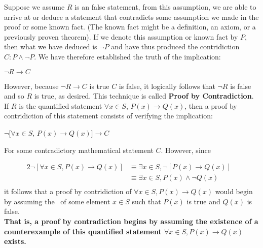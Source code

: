 Suppose we assume $R$ is an false statement, from this assumption, we are able to arrive at or deduce a statement that contradicts some assumption we made in the proof or some known fact. (The known fact might be a definition, an axiom, or a previously proven theorem). If we denote this assumption or known fact by $P$, then what we have deduced is $\neg P$ and have thus produced the contridiction $C:P \wedge \neg P$. We  have therefore established the truth of the implication: 
	\begin{center}
		$\neg R \to C$
	\end{center}	 
However, because $\neg R \to C$ is true $C$ is false, it logically follows that $\neg R$ is false and so $R$ is true, as desired. This technique is called {\bf Proof by Contradiction}.\\

If $R$ is the quantified statement $\forall x \in S$, $P(x) \to Q(x)$, then a proof by contridiction of this statement consists of verifying the implication:
	\begin{center}
		$\neg [\forall x \in S$, $P(x) \to Q(x)] \to C$
	\end{center}
For some contradictory mathematical statement $C$. However, since  

	\begin{alignat*}{2}
 		\neg [\forall x \in S, P(x) \to Q(x)]	& \equiv \exists x \in S, \neg [P(x) \to Q(x)] & \\
 		& \equiv \exists x \in S,P(x) \wedge \neg Q(x) & \\	
	\end{alignat*} 
it follows that a proof by contridiction of $\forall x \in S, P(x) \to Q(x)$ would begin by assuming the \ of some element $x \in S$ such that $P(x)$ is true and $Q(x)$ is false.\\
{\bf That is, a proof by contradiction begins by assuming the existence of a counterexample of this quantified statement $\forall x \in S, P(x) \to Q(x)$ exists.} 


\newpage
